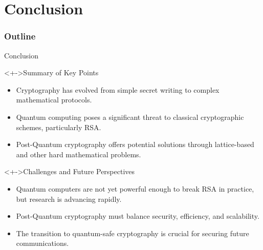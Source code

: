 \documentclass{beamer}
\begin{document}
\section{Conclusion}
\begin{frame}
  \frametitle{Outline}
  \tableofcontents[currentsection]
\end{frame}
\begin{frame}{Conclusion}
\begin{linenumbers}
    \begin{block}<+->{Summary of Key Points}
        \begin{itemize}
            \item Cryptography has evolved from simple secret writing to complex mathematical protocols.
            \item Quantum computing poses a significant threat to classical cryptographic schemes, particularly RSA.
            \item Post-Quantum cryptography offers potential solutions through lattice-based and other hard mathematical problems.
        \end{itemize}
    \end{block}
    
    \begin{block}<+->{Challenges and Future Perspectives}
        \begin{itemize}
            \item Quantum computers are not yet powerful enough to break RSA in practice, but research is advancing rapidly.
            \item Post-Quantum cryptography must balance security, efficiency, and scalability.
            \item The transition to quantum-safe cryptography is crucial for securing future communications.
        \end{itemize}
    \end{block}
    
\end{linenumbers}
\end{frame}
\end{document}
